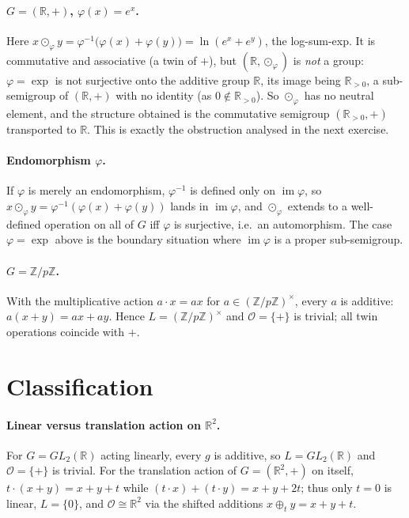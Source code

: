 \documentclass[11pt,a4paper,openany]{book}
\theoremstyle{plain}
\theoremstyle{definition}
\newcommand{\twing}[1]{\odot_{#1}}
\newcommand{\opspace}{\mathcal{O}}
\newcommand{\lingroup}{L}
\newcommand{\RR}{\mathbb{R}}
\newcommand{\ZZ}{\mathbb{Z}}
\begin{document}
\paragraph{$G=(\RR,+)$, $\varphi(x)=e^x$.}
Here $x\twing{\varphi}y=\varphi^{-1}\big(\varphi(x)+\varphi(y)\big)=\ln(e^x+e^y)$, the log-sum-exp. It is commutative and associative (a twin of $+$), but $(\RR,\twing{\varphi})$ is \emph{not} a group: $\varphi=\exp$ is not surjective onto the additive group $\RR$, its image being $\RR_{>0}$, a sub-semigroup of $(\RR,+)$ with no identity (as $0\notin\RR_{>0}$). So $\twing{\varphi}$ has no neutral element, and the structure obtained is the commutative semigroup $(\RR_{>0},+)$ transported to $\RR$. This is exactly the obstruction analysed in the next exercise.

\paragraph{Endomorphism $\varphi$.}
If $\varphi$ is merely an endomorphism, $\varphi^{-1}$ is defined only on $\operatorname{im}\varphi$, so $x\twing{\varphi}y=\varphi^{-1}(\varphi(x)+\varphi(y))$ lands in $\operatorname{im}\varphi$, and $\twing{\varphi}$ extends to a well-defined operation on all of $G$ iff $\varphi$ is surjective, i.e.\ an automorphism. The case $\varphi=\exp$ above is the boundary situation where $\operatorname{im}\varphi$ is a proper sub-semigroup.

\paragraph{$G=\ZZ/p\ZZ$.}
With the multiplicative action $a\cdot x=ax$ for $a\in(\ZZ/p\ZZ)^\times$, every $a$ is additive: $a(x+y)=ax+ay$. Hence $\lingroup=(\ZZ/p\ZZ)^\times$ and $\opspace=\{+\}$ is trivial; all twin operations coincide with $+$.

\section*{Classification}

\paragraph{Linear versus translation action on $\RR^2$.}
For $G=GL_2(\RR)$ acting linearly, every $g$ is additive, so $\lingroup=GL_2(\RR)$ and $\opspace=\{+\}$ is trivial. For the translation action of $G=(\RR^2,+)$ on itself, $t\cdot(x+y)=x+y+t$ while $(t\cdot x)+(t\cdot y)=x+y+2t$; thus only $t=0$ is linear, $\lingroup=\{0\}$, and $\opspace\cong\RR^2$ via the shifted additions $x\oplus_t y=x+y+t$.
\end{document}
